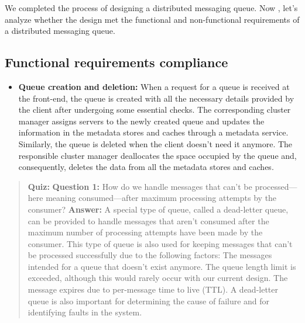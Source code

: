 

We completed the process of designing a distributed messaging queue. Now , let's analyze whether the design met the functional and non-functional requirements of a distributed messaging queue.

\subsection{Functional requirements compliance}\label{_f-6jo5KJgieSaQfvUZVt}

\begin{itemize}
\item
\protect{}\label{nwy8XQa_km4z4eIwjc0GD}
\textbf{Queue creation and deletion:} When a request for a queue is received at the front-end, the queue is created with all the necessary details provided by the client after undergoing some essential checks. The corresponding cluster manager assigns servers to the newly created queue and updates the information in the metadata stores and caches through a metadata service.\\
Similarly, the queue is deleted when the client doesn't need it anymore. The responsible cluster manager deallocates the space occupied by the queue and, consequently, deletes the data from all the metadata stores and caches.
\end{itemize}

\begin{quote}
\textbf{Quiz:}
\textbf{Question 1:} How do we handle messages that can't be processed---here meaning consumed---after maximum processing attempts by the consumer?
\textbf{Answer:} A special type of queue, called a dead-letter queue, can be provided to handle messages that aren't consumed after the maximum number of processing attempts have been made by the consumer. This type of queue is also used for keeping messages that can't be processed successfully due to the following factors: The messages intended for a queue that doesn't exist anymore. The queue length limit is exceeded, although this would rarely occur with our current design. The message expires due to per-message time to live (TTL). A dead-letter queue is also important for determining the cause of failure and for identifying faults in the system.
\end{quote}

